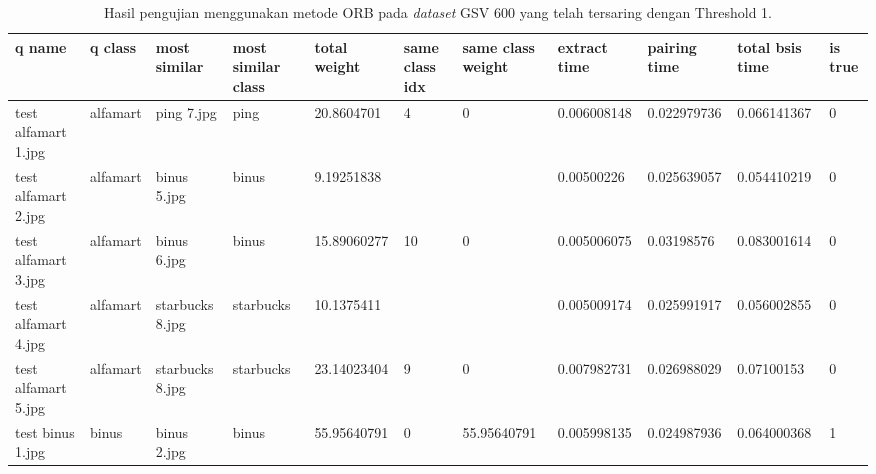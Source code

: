 \begin{landscape}
	\begin{longtable}{|p{2cm}|p{1.5cm}|p{2cm}|p{1.5cm}|p{2cm}|p{1cm}|p{2cm}|p{2cm}|p{2cm}|p{2cm}|p{1cm}|}
		\caption{Hasil pengujian menggunakan metode ORB pada \textit{dataset} GSV 600 yang telah tersaring dengan Threshold 1.} \\
		\hline
		\textbf{q name}      & \textbf{q class} & \textbf{most similar} & \textbf{most similar class} & \textbf{total weight} & \textbf{same class idx} & \textbf{same class weight} & \textbf{extract time} & \textbf{pairing time} & \textbf{total bsis time} & \textbf{is true} \\ \hline
		test alfamart 1.jpg  & alfamart         & ping 7.jpg            & ping                        & 20.8604701            & 4                       & 0                          & 0.006008148           & 0.022979736           & 0.066141367              & 0                \\ \hline
		test alfamart 2.jpg  & alfamart         & binus 5.jpg           & binus                       & 9.19251838            &                         &                            & 0.00500226            & 0.025639057           & 0.054410219              & 0                \\ \hline
		test alfamart 3.jpg  & alfamart         & binus 6.jpg           & binus                       & 15.89060277           & 10                      & 0                          & 0.005006075           & 0.03198576            & 0.083001614              & 0                \\ \hline
		test alfamart 4.jpg  & alfamart         & starbucks 8.jpg       & starbucks                   & 10.1375411            &                         &                            & 0.005009174           & 0.025991917           & 0.056002855              & 0                \\ \hline
		test alfamart 5.jpg  & alfamart         & starbucks 8.jpg       & starbucks                   & 23.14023404           & 9                       & 0                          & 0.007982731           & 0.026988029           & 0.07100153               & 0                \\ \hline
		test binus 1.jpg     & binus            & binus 2.jpg           & binus                       & 55.95640791           & 0                       & 55.95640791                & 0.005998135           & 0.024987936           & 0.064000368              & 1                \\ \hline

\end{longtable}
\end{landscape}
